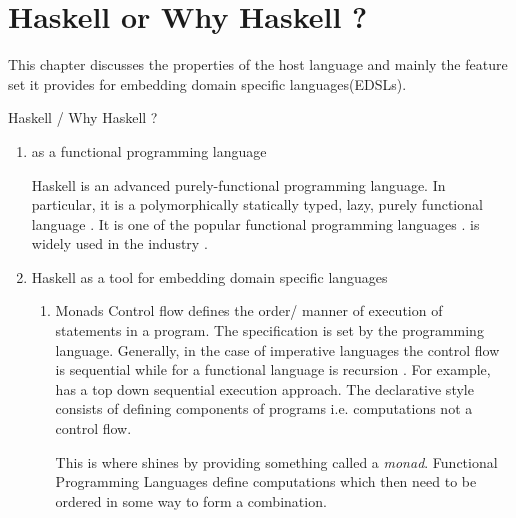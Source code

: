 \documentclass[proposal.tex]{subfiles}
\begin{document}
\section{Haskell or Why Haskell ?}\label{sect:hwh}

\par This chapter discusses the properties of the host language  and mainly the feature set it provides for embedding 
domain specific languages(EDSLs).

Haskell / Why Haskell ?
\begin{enumerate}

\item {} as a functional programming language

Haskell is an advanced purely-functional programming language. In particular, it is a polymorphically statically typed, lazy, purely 
functional language \cite{website:haskellwiki}. It is one of the popular functional programming languages \cite{website:langpop}. 
 is widely used in the industry \cite{website:haskellinindustry}. 

\item Haskell as a tool for embedding domain specific languages\cite{website:paulspontifications}

\begin{enumerate}
\item Monads
\newline  
Control flow defines the order/ manner of execution of statements in a program\cite{website:controlflowwiki}. The specification is set by 
the programming language. Generally, in the case of imperative languages the control flow is sequential while for a functional language
is recursion \cite{website:controlflowdalhousie}. For example,  has a top down sequential execution approach. The 
declarative style consists of defining components of programs i.e. computations not a control 
flow\cite{website:declarativeprogrammingwiki}.     

This is where  shines by providing something called a \textit{monad}. Functional Programming Languages define 
computations which then need to be ordered in some way to form a combination. \cite{website:monadascomputation}    

\begin{comment}
Each language has a flow of control, a model how programs are executed. Many languages for example \progLang{Java} have a top-down 
sequential execution approach. But very few languages allow control flow modelling, for example in a functional language how the 
propagation of side effects is handled. A monad provides the ability to customize and develop your own model from one step to another, how 
side effects are handled. \cite{website:paulspontifications}        
\end{comment}


\end{enumerate}
\end{enumerate}
\end{document}
